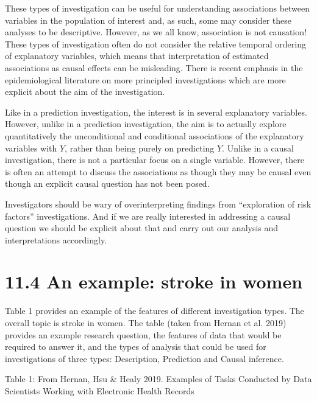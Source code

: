 \documentclass[letterpaper,10pt,english]{jupyterBook}
\begin{document}
\sphinxAtStartPar
These types of investigation can be useful for understanding associations between variables in the population of interest and, as such, some may consider these analyses to be descriptive. However, as we all know, association is not causation! These types of investigation often do not consider the relative temporal ordering of explanatory variables, which means that interpretation of estimated associations as causal effects can be misleading. There is recent emphasis in the epidemiological literature on more principled investigations which are more explicit about the aim of the investigation.

\sphinxAtStartPar
Like in a prediction investigation, the interest is in several explanatory variables. However, unlike in a prediction investigation, the aim is to actually explore quantitatively the unconditional and conditional associations of the explanatory variables with \(Y\), rather than being purely on predicting \(Y\). Unlike in a causal investigation, there is not a particular focus on a single variable. However, there is often an attempt to discuss the associations as though they may be causal even though an explicit causal question has not been posed.

\sphinxAtStartPar
Investigators should be wary of over\sphinxhyphen{}interpreting findings from “exploration of risk factors” investigations. And if we are really interested in addressing a causal question we should be explicit about that and carry out our analysis and interpretations accordingly.


\section{11.4 An example: stroke in women}
\label{\detokenize{11.e. Types of Investigation:an-example-stroke-in-women}}\label{\detokenize{11.e. Types of Investigation::doc}}
\sphinxAtStartPar
Table 1 provides an example of the features of different investigation types. The overall topic is stroke in women. The table (taken from Hernan et al. 2019) provides an example research question, the features of data that would be required to answer it, and the types of analysis that could be used for investigations of three types: Description, Prediction and Causal inference.

\sphinxAtStartPar
Table 1: From Hernan, Hsu \& Healy 2019. Examples of Tasks Conducted by Data Scientists Working with Electronic Health Records
\end{document}

